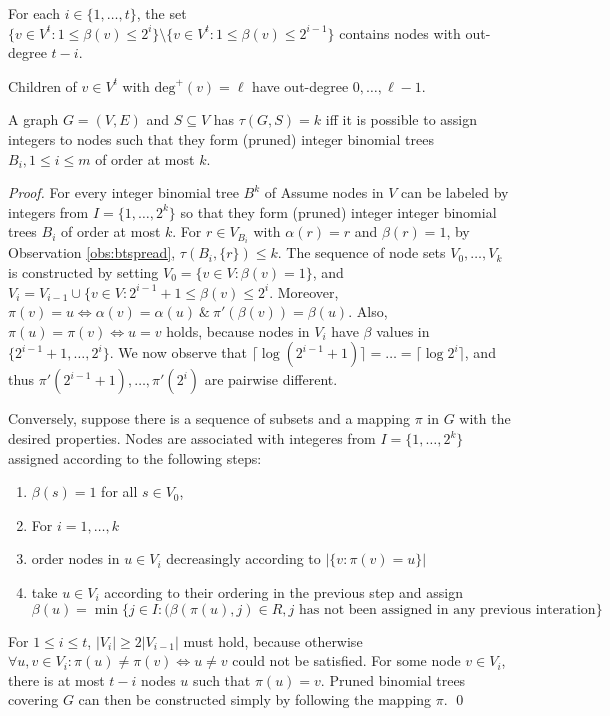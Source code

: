 \begin{observation}\label{obs:deg}
For each $i\in\{1,\dots,t\}$, the set $\{v\in V^t: 1\leq\beta(v)\leq2^i\}\setminus\{v\in V^t:1\leq\beta(v)\leq2^{i-1}\}$ contains nodes with out-degree $t-i$.
\end{observation}
\begin{observation}\label{obs:childdeg}
Children of $v\in V^t$ with $\text{deg}^+(v)=\ell$ have out-degree $0,\dots,\ell-1$.
\end{observation}
\begin{proposition}\label{lem:probeq}
A graph $G=(V,E)$ and $S\subseteq V$ has $\tau(G,S)=k$ iff it is possible to assign integers to nodes
such that they form (pruned) integer binomial trees $B_i, 1\leq i\leq m$ of order at most $k$.
\end{proposition}
\begin{proof}
For every integer binomial tree $B^k$ of 
Assume nodes in $V$ can be labeled by integers from $I=\{1,\dots,2^k\}$ so that they form (pruned) integer integer binomial trees $B_i$ of order at most $k$.
For $r\in V_{B_i}$ with $\alpha(r)=r$ and $\beta(r)=1$, by Observation \ref{obs:btspread}, $\tau(B_i,\{r\})\leq k$.
The sequence of node sets $V_0,\dots,V_k$ is constructed by setting $V_0=\{v\in V:\beta(v)=1\}$, and $V_{i}=V_{i-1}\cup\{v\in V: 2^{i-1}+1\leq\beta(v)\leq 2^i$.
Moreover, $\pi(v)=u\Leftrightarrow \alpha(v)=\alpha(u)~\&~\pi'(\beta(v))=\beta(u)$.
Also, $\pi(u)=\pi(v)\Leftrightarrow u=v$ holds, because nodes in $V_i$ have $\beta$ values in $\{2^{i-1}+1,\dots,2^i\}$.
We now observe that $\lceil\log (2^{i-1}+1)\rceil=\dots =\lceil\log 2^i\rceil$, and thus $\pi'(2^{i-1}+1),\dots,\pi'(2^i)$ are pairwise different. 

Conversely, suppose there is a sequence of subsets and a mapping $\pi$ in $G$ with the desired properties.
Nodes are associated with integeres from $I=\{1,\dots,2^k\}$ assigned according to the following steps:
\begin{enumerate}
\item $\beta(s)=1$ for all $s\in V_0$,
\item For $i=1,\dots,k$ 
\item[] order nodes in $u\in V_i$ decreasingly according to $|\{v:\pi(v)=u\}|$
\item[] take $u\in V_i$ according to their ordering in the previous step and assign $\beta(u)=\min\{j\in I: (\beta(\pi(u),j)\in R, j \text{ has not been assigned in any previous interation}\}$

\end{enumerate}

For $1\leq i\leq t$, $|V_i|\geq2|V_{i-1}|$ must hold, because otherwise $\forall u,v\in V_i:\pi(u)\neq \pi(v)\Leftrightarrow u\neq v$ could not be satisfied.
For some node $v\in V_i$, there is at most $t-i$ nodes $u$ such that $\pi(u)=v$.
Pruned binomial trees covering $G$ can then be constructed simply by following the mapping $\pi$.
\qed
\end{proof}

